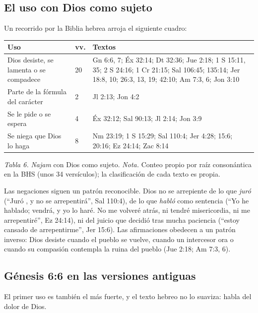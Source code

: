 \subsection{El uso con Dios como sujeto}
Un recorrido por la Biblia hebrea arroja el siguiente cuadro:

\begin{center}\small\renewcommand{\arraystretch}{1.18}
\begin{tabular}{@{}L{3.4cm}L{0.8cm}L{9.6cm}@{}}
\toprule
\textbf{Uso} & \textbf{vv.} & \textbf{Textos} \\ \midrule
Dios desiste, se lamenta o se compadece & 20 & Gn 6:6, 7; Éx 32:14; Dt 32:36; Jue 2:18; 1 S 15:11, 35; 2 S 24:16; 1 Cr 21:15; Sal 106:45; 135:14; Jer 18:8, 10; 26:3, 13, 19; 42:10; Am 7:3, 6; Jon 3:10 \\
Parte de la fórmula del carácter & 2 & Jl 2:13; Jon 4:2 \\
Se le pide o se espera & 4 & Éx 32:12; Sal 90:13; Jl 2:14; Jon 3:9 \\
Se niega que Dios lo haga & 8 & Nm 23:19; 1 S 15:29; Sal 110:4; Jer 4:28; 15:6; 20:16; Ez 24:14; Zac 8:14 \\
\bottomrule
\end{tabular}\par
{\footnotesize\color{gris}\textit{Tabla 6.} \emph{Najam} con Dios como sujeto. \textit{Nota.} Conteo propio por raíz consonántica en la BHS (unos 34 versículos); la clasificación de cada texto es propia.}
\end{center}


Las negaciones siguen un patrón reconocible. Dios no se arrepiente de lo que \emph{juró} (``Juró \SENOR, y no se arrepentirá'', Sal 110:4), de lo que \emph{habló} como sentencia (``Yo \SENOR{} he hablado; vendrá, y yo lo haré. No me volveré atrás, ni tendré misericordia, ni me arrepentiré'', Ez 24:14), ni del juicio que decidió tras mucha paciencia (``estoy cansado de arrepentirme'', Jer 15:6). Las afirmaciones obedecen a un patrón inverso: Dios desiste cuando el pueblo se vuelve, cuando un intercesor ora o cuando su compasión contempla la ruina del pueblo (Jue 2:18; Am 7:3, 6).

\subsection{Génesis 6:6 en las versiones antiguas}
El primer uso es también el más fuerte, y el texto hebreo no lo suaviza: habla del dolor de Dios.

